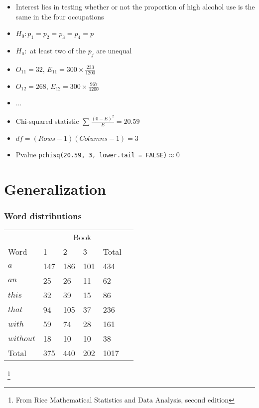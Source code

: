 \documentclass[aspectratio=169]{beamer}
\begin{document}
\begin{frame}
\begin{itemize}
\item Interest lies in testing whether or not the proportion of high alcohol use
  is the same in the four occupations
\item $H_0:p_1 = p_2 = p_3 = p_4 = p$ 
\item $H_a:$ at least two of the $p_j$ are unequal 
\item $O_{11} = 32$, $E_{11} = 300 \times \frac{233}{1200}$
\item $O_{12} = 268$, $E_{12} = 300 \times \frac{967}{1200}$
\item ...
\item Chi-squared statistic $\sum \frac{(0 - E)^2}{E} = 20.59$
\item $df=(Rows - 1)(Columns - 1) = 3$
\item Pvalue \texttt{pchisq(20.59, 3, lower.tail = FALSE)}$\approx 0$
\end{itemize}
\end{frame} 

\section{Generalization}
\begin{frame}\frametitle{Word distributions}
\begin{center}
\ttfamily
  \begin{tabular}{llllll}
       & \multicolumn{4}{c}{Book} &\\
Word      & 1   & 2   & 3   &  Total\\ \hline
$a$       & 147 & 186 & 101 &  434\\
$an$      & 25  & 26  & 11  &  62\\
$this$    & 32  & 39  & 15  &  86\\
$that$    & 94  & 105 & 37  &  236\\
$with$    & 59  & 74  & 28  &  161\\
$without$ & 18  & 10  & 10  &  38\\ \hline
Total     & 375 & 440 & 202 &  1017\\
  \end{tabular}
\normalfont
\end{center}
~\footnote{From Rice Mathematical Statistics and Data Analysis, second edition}
\end{frame}
\end{document}
